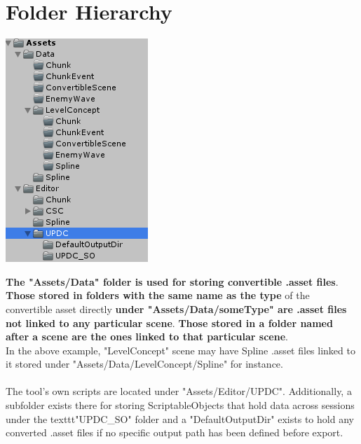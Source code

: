 \documentclass[12pt,a4paper]{article}
\begin{document}
\section{Folder Hierarchy}
\begin{center}
\includegraphics[scale=1.0]{folderStructureUPDC}
\end{center}
\textbf{The "Assets/Data" folder is used for storing convertible .asset files}. \textbf{Those stored in folders with the same name as the type} of the convertible asset directly \textbf{under "Assets/Data/someType" are .asset files not linked to any particular scene}.
\textbf{Those stored in a folder named after a scene are the ones linked to that particular scene}.\\
In the above example, "LevelConcept" scene may have Spline .asset files linked to it stored under "Assets/Data/LevelConcept/Spline" for instance.\\\\
The tool's own scripts are located under "Assets/Editor/UPDC". Additionally, a subfolder exists there for storing ScriptableObjects that hold data across sessions under the texttt{"UPDC\_SO"} folder and a "DefaultOutputDir" exists to hold any converted .asset files if no specific output path has been defined before export.
\end{document}
